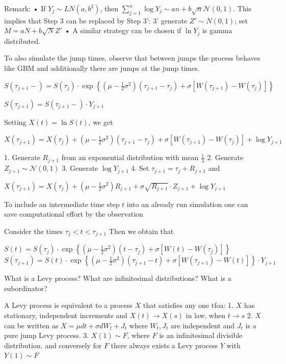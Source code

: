 Remark:
• If \(Y_j \sim LN(a, b^2)\), then
\(\sum_{j=1}^{n} \log Y_{j} \sim an + b \sqrt{n} \mathcal{N}(0,1)\).
This implies that Step 3 can be replaced by Step 3':
3' generate \(Z' \sim N(0, 1)\); set \(M = aN + b \sqrt{N} Z'\)
• A similar strategy can be chosen if \(\ln Y_j\) is gamma distributed.


To also simulate the jump times, observe that
between jumps the process behaves like GBM
and additionally there are jumps at the jump times.

\(S(\tau_{j+1}-) = S(\tau_{j}) \cdot \exp \left\{ (\mu - \frac{1}{2} \sigma^2) (\tau_{j+1} - \tau_j) + \sigma [W(\tau_{j+1}) - W(\tau_j)] \right\}\)

\(S(\tau_{j+1}) = S(\tau_{j+1}-) \cdot Y_{j+1}\)

Setting \(X(t) = \ln S(t)\), we get

\(X(\tau_{j+1}) = X(\tau_{j}) + (\mu - \frac{1}{2} \sigma^2) (\tau_{j+1} - \tau_j) + \sigma [W(\tau_{j+1}) - W(\tau_j)] + \log Y_{j+1}\)

1. Generate \(R_{j+1}\) from an exponential distribution with mean \(\frac{1}{\lambda}\) 
2. Generate \(Z_{j+1} \sim \mathcal{N}(0,1)\)
3. Generate \(\log Y_{j+1}\)
4. Set \(\tau_{j+1} = \tau_{j} + R_{j+1}\) and

\(X(\tau_{j+1}) = X(\tau_{j}) + (\mu - \frac{1}{2} \sigma^2) R_{j+1} + \sigma \sqrt{R_{j+1}} \cdot Z_{j+1} + \log Y_{j+1}\)

To include an intermediate time step \( t \) into an already run simulation one can save computational effort by the observation

Consider the times
\(\tau_j < t < \tau_{j+1}\)
Then we obtain that

\(S(t) = S(\tau_{j}) \cdot \exp \left\{ (\mu - \frac{1}{2} \sigma^2) (t - \tau_j) + \sigma [W(t) - W(\tau_j)] \right\}\)
\(S(\tau_{j+1}) = S(t) \cdot \exp \left\{ (\mu - \frac{1}{2} \sigma^2) (\tau_{j+1} - t) + \sigma [W(\tau_{j+1}) - W(t)] \right\} \cdot Y_{j+1}\)

What is a Levy process? What are infinitesimal distributions? What is a subordinator?

A Levy process is equivalent to a process \( X \) that satisfies any one tfoa:
1. \( X \) has stationary, independent increments and \( X(t) \to X(s) \) in law, when \( t \to s \)
2. \( X \) can be written as \( X = \mu dt + \sigma dW_t + J_t\) where \( W_t, J_t \) are independent
and \( J_t \) is a pure jump Levy process.
3. \( X(1) \sim F \), where \( F \) is an infinitesimal divisible distribution.
and conversely for \( F \) there always exists a Levy process \( Y \) with \( Y(1) \sim F \)

